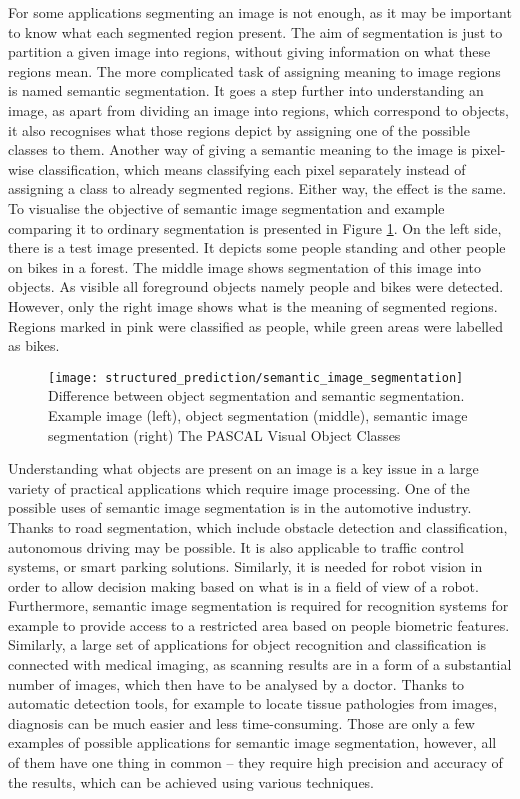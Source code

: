 For some applications segmenting an image is not enough, as it may be important to know what each segmented region present. The aim of segmentation is just to partition a given image into regions, without giving information on what these regions mean. The more complicated task of assigning meaning to image regions is named semantic segmentation. It goes a step further into understanding an image, as apart from dividing an image into regions, which correspond to objects, it also recognises what those regions depict by assigning one of the possible classes to them. Another way of giving a semantic meaning to the image is pixel-wise classification, which means classifying each pixel separately instead of assigning a class to already segmented regions.  Either way, the effect is the same. To visualise the objective of semantic image segmentation and example comparing it to ordinary segmentation is presented in Figure  \ref{fig:semantic_image_segmentation}. 
On the left side, there is a test image presented. It depicts some people standing and other people on bikes in a forest. The middle image shows segmentation of this image into objects. As visible all foreground objects namely people and bikes were detected. However, only the right image shows what is the meaning of segmented regions. Regions marked in pink were classified as people, while green areas were labelled as bikes. 
\begin{figure}[h]
    \texttt{[image: structured\_prediction/semantic\_image\_segmentation]}
    \captionsource
    {Difference between object segmentation and semantic segmentation. Example image (left), object segmentation (middle), semantic image segmentation (right)}
    {The PASCAL Visual Object Classes \cite{voc}}
     \label{fig:semantic_image_segmentation}
\end{figure}

Understanding what objects are present on an image is a key issue in a large variety of practical applications which require image processing. One of the possible uses of semantic image segmentation is in the automotive industry. Thanks to road segmentation, which include obstacle detection and classification, autonomous driving may be possible. It is also applicable to traffic control systems, or smart parking solutions. Similarly, it is needed for robot vision in order to allow decision making based on what is in a field of view of a robot.  Furthermore, semantic image segmentation is required for recognition systems for example to provide access to a restricted area based on people biometric features. Similarly, a large set of applications for object recognition and classification is connected with medical imaging, as scanning results are in a form of a substantial number of images, which then have to be analysed by a doctor. Thanks to automatic detection tools, for example to locate tissue pathologies from images, diagnosis can be much easier and less time-consuming.  Those are only a few examples of possible applications for semantic image segmentation, however, all of them have one thing in common – they require high precision and accuracy of the results, which can be achieved using various techniques. 
 
